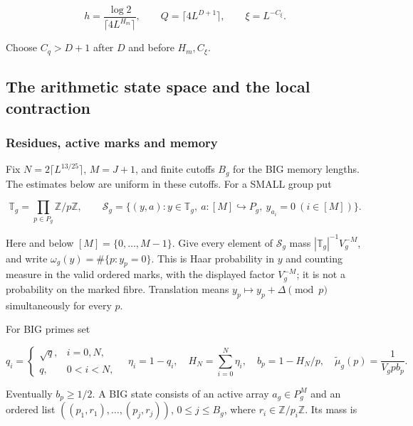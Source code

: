 \[
h=\frac{\log2}{\lceil4L^{H_m}\rceil},\qquad
Q=\lceil4L^{D+1}\rceil,\qquad \xi=L^{-C_\xi}. \tag{M10}
\]

Choose \(C_q>D+1\) after \(D\) and before \(H_m,C_\xi\).


\hypertarget{marked-correlation-the-arithmetic-state-space-and-the-local-contraction}{%
\subsection{The arithmetic state space and the local
contraction}\label{marked-correlation-the-arithmetic-state-space-and-the-local-contraction}}


\hypertarget{marked-correlation-residues-active-marks-and-memory}{%
\subsubsection{Residues, active marks and
memory}\label{marked-correlation-residues-active-marks-and-memory}}

Fix \(N=2\lceil L^{13/25}\rceil\), \(M=J+1\), and finite cutoffs \(B_g\)
for the BIG memory lengths. The estimates below are uniform in these
cutoffs. For a SMALL group put

\[
\mathbb T_g=\prod_{p\in P_g}\mathbb Z/p\mathbb Z,
\qquad
\mathscr S_g=\{(y,a):y\in\mathbb T_g,\ a:[M]\hookrightarrow P_g,
                         \ y_{a_i}=0\ (i\in[M])\}.
\tag{T1}
\]

Here and below \([M]=\{0,\ldots,M-1\}\). Give every element of
\(\mathscr S_g\) mass \(|\mathbb T_g|^{-1}V_g^{-M}\), and write
\(\omega_g(y)=\#\{p:y_p=0\}\). This is Haar probability in \(y\) and
counting measure in the valid ordered marks, with the displayed factor
\(V_g^{-M}\); it is not a probability on the marked fibre. Translation
means \(y_p\mapsto y_p+\Delta\pmod p\) simultaneously for every \(p\).

For BIG primes set

\[
q_i=\begin{cases}\sqrt q,&i=0,N,\\q,&0<i<N,\end{cases}
\quad \eta_i=1-q_i,\quad H_N=\sum_{i=0}^N\eta_i,
\quad b_p=1-H_N/p,\quad \widetilde\mu_g(p)=\frac1{V_gp b_p}.
\tag{T2}
\]

Eventually \(b_p\ge1/2\). A BIG state consists of an active array
\(a_g\in P_g^M\) and an ordered list \(((p_1,r_1),\ldots,(p_j,r_j))\),
\(0\le j\le B_g\), where \(r_i\in\mathbb Z/p_i\mathbb Z\). Its mass is

